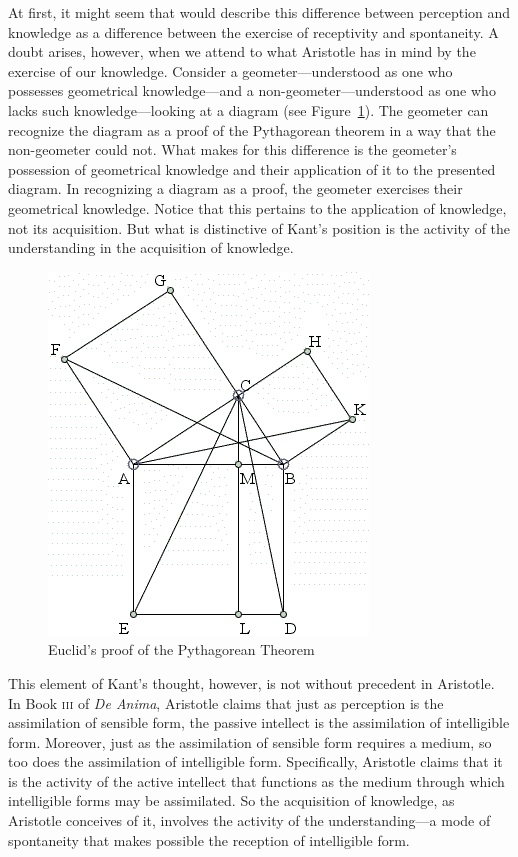 At first, it might seem that \citet{Kant:1781fk} would describe this difference between perception and knowledge as a difference between the exercise of receptivity and spontaneity. A doubt arises, however, when we attend to what Aristotle has in mind by the exercise of our knowledge. Consider a geometer---understood as one who possesses geometrical knowledge---and a non-geo\-me\-ter\----understood as one who lacks such knowledge---looking at a diagram (see Figure~\ref{fig:1.5}). The geometer can recognize the diagram as a proof of the Pythagorean theorem in a way that the non-geometer could not. What makes for this difference is the geometer's possession of geometrical knowledge and their application of it to the presented diagram. In recognizing a diagram as a proof, the geometer exercises their geometrical knowledge. Notice that this pertains to the application of knowledge, not its acquisition. But what is distinctive of Kant's position is the activity of the understanding in the acquisition of knowledge. 

\begin{figure}[htbp]
    \centering
        \includegraphics[scale=.55]{graphics/euclid.jpg}
    \caption{Euclid's proof of the Pythagorean Theorem}
    \label{fig:1.5}
\end{figure}

This element of Kant's thought, however, is not without precedent in Aristotle. In Book \textsc{iii} of \emph{De Anima}, Aristotle claims that just as perception is the assimilation of sensible form, the passive intellect is the assimilation of intelligible form. Moreover, just as the assimilation of sensible form requires a medium, so too does the assimilation of intelligible form. Specifically, Aristotle claims that it is the activity of the active intellect that functions as the medium through which intelligible forms may be assimilated. So the acquisition of knowledge, as Aristotle conceives of it, involves the activity of the understanding---a mode of spontaneity that makes possible the reception of intelligible form.

